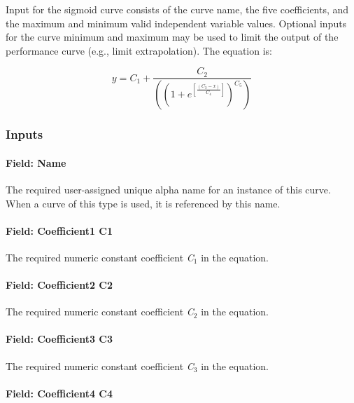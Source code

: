 Input for the sigmoid curve consists of the curve name, the five coefficients, and the maximum and minimum valid independent variable values. Optional inputs for the curve minimum and maximum may be used to limit the output of the performance curve (e.g., limit extrapolation). The equation is:

\begin{equation}
y = {C_1} + \frac{{{C_2}}}{{\left( {{{(1 + {e^{\left[ {\frac{{({C_3} - x)}}{{{C_4}}}} \right]}})}^{{C_5}}}} \right)}}
\end{equation}

\subsubsection{Inputs}\label{inputs-14-008}

\paragraph{Field: Name}\label{field-name-14-005}

The required user-assigned unique alpha name for an instance of this curve. When a curve of this type is used, it is referenced by this name.

\paragraph{Field: Coefficient1 C1}\label{field-coefficient1-c1-1}

The required numeric constant coefficient \emph{C\(_{1}\)} in the equation.

\paragraph{Field: Coefficient2 C2}\label{field-coefficient2-c2-1}

The required numeric constant coefficient \emph{C\(_{2}\)} in the equation.

\paragraph{Field: Coefficient3 C3}\label{field-coefficient3-c3-1}

The required numeric constant coefficient \emph{C\(_{3}\)} in the equation.

\paragraph{Field: Coefficient4 C4}\label{field-coefficient4-c4-1}

